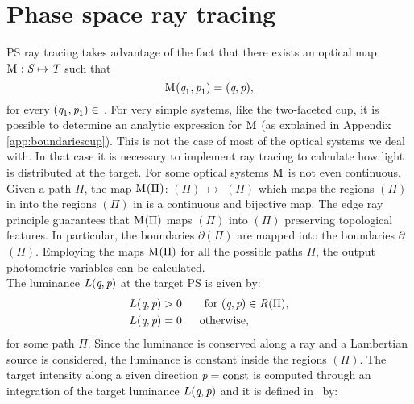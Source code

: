 \section{Phase space ray tracing}
PS ray tracing takes advantage of the fact that there exists an optical map 
$
\mathrm{M}_{\textit{}}: \mbox{$\emph{S}_{\textit{}}$} \mapsto \mbox{$\emph{T}_{\textit{}}$}
$
 such that
\begin{equation} 
\mathrm{M}_{\textit{}}(\textit{q}_1,\textit{p}_1)=(\textit{q},\textit{p}), 
\end{equation} for every $(\textit{q}_1,\textit{p}_1)\in$ . 
For very simple systems, like the two-faceted cup, it is possible to determine an analytic expression for $\mathrm{M}_{\textit{}}$ (as explained in Appendix \ref{app:boundariescup}).
This is not the case of most of the optical systems we deal with. In that case it is necessary to implement ray tracing to calculate how light is distributed at the target. 
For some optical systems $\mathrm{M}_{\textit{}}$ is not even continuous. 
Given a path $\Pi$, the map $\mathrm{M}_{\textit{}}(\Pi)$: $(\Pi)$ $\mapsto$ $(\Pi)$ 
which maps the regions $(\Pi)$ in  into the regions $(\Pi)$ in  is a continuous and bijective map.
  The edge ray principle guarantees that $\mathrm{M}_{\textit{}}(\Pi)$ maps $(\Pi)$ into $(\Pi)$ preserving topological features. In particular, the boundaries $\partial$$(\Pi)$ are mapped into the boundaries $\partial$$(\Pi)$. %
Employing the maps $\mathrm{M}_{\textit{}}(\Pi)$ for all the possible paths $\Pi$, the output photometric variables can be calculated.
\\ \indent The luminance $L(\textit{q}, \textit{p})$ at the target PS is given by:
\begin{equation}
\begin{aligned}
\label{eq:PSluminance}
L(\variabile{q}, \variabile{p}) &> 0  & \quad \mbox{for } (\variabile{q}, \variabile{p})\in \mbox{\set{R}{}{}}(\Pi),\\ \vspace{0.5 cm}
L(\variabile{q}, \variabile{p}) &= 0 & \mbox{otherwise},\qquad \quad \;\;
\end{aligned}
\end{equation}
for some path $\Pi$. Since the luminance is conserved along a ray and a Lambertian source is considered, the luminance is constant inside the regions $(\Pi)$.
The target intensity along a given direction $\textit{p}=\textrm{const}$ is computed through an integration of the target luminance $L(\textit{q}, \textit{p})$ and it is defined in $\,$ by:
